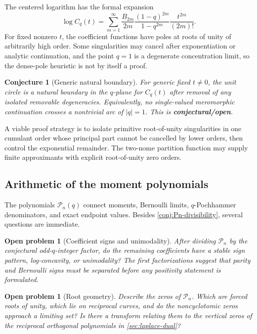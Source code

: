 \documentclass[11pt,oneside]{article}
\numberwithin{equation}{section}
\newtheorem{conjecture}[theorem]{Conjecture}
\newtheorem{problem}[theorem]{Open problem}
\theoremstyle{definition}
\theoremstyle{remark}
\newcommand{\openstatus}{\textcolor{deepred}{\textbf{conjectural/open}}}
\begin{document}
The centered logarithm has the formal expansion
\begin{equation}
 \log C_q(t)=
 \sum_{m=1}^{\infty}
 \frac{B_{2m}}{2m}
 \frac{(1-q)^{2m}}{1-q^{2m}}
 \frac{t^{2m}}{(2m)!}.
 \label{eq:logC-q}
\end{equation}
For fixed nonzero $t$, the coefficient functions have poles at roots of unity
of arbitrarily high order.  Some singularities may cancel after exponentiation
or analytic continuation, and the point $q=1$ is a degenerate concentration
limit, so the dense-pole heuristic is not by itself a proof.

\begin{conjecture}[Generic natural boundary]
\label{conj:natural-boundary}
For generic fixed $t\ne0$, the unit circle is a natural boundary in the
$q$-plane for $C_q(t)$ after removal of any isolated removable degeneracies.
Equivalently, no single-valued meromorphic continuation crosses a nontrivial
arc of $|q|=1$.  This is \openstatus.
\end{conjecture}

A viable proof strategy is to isolate primitive root-of-unity singularities in
one cumulant order whose principal part cannot be cancelled by lower orders,
then control the exponential remainder.  The two-nome partition function may
supply finite approximants with explicit root-of-unity zero orders.

\subsection{Arithmetic of the moment polynomials}

The polynomials $\mathcal P_n(q)$ connect moments, Bernoulli limits,
$q$-Pochhammer denominators, and exact endpoint values.  Besides
\cref{conj:Pn-divisibility}, several questions are immediate.

\begin{problem}[Coefficient signs and unimodality]
After dividing $\mathcal P_n$ by the conjectural odd-$q$-integer factor, do the
remaining coefficients have a stable sign pattern, log-concavity, or
unimodality?  The first factorizations suggest that parity and Bernoulli signs
must be separated before any positivity statement is formulated.
\end{problem}

\begin{problem}[Root geometry]
Describe the zeros of $\mathcal P_n$.  Which are forced roots of unity, which
lie on reciprocal curves, and do the noncyclotomic zeros approach a limiting
set?  Is there a transform relating them to the vertical zeros of the
reciprocal orthogonal polynomials in \cref{sec:laplace-dual}?
\end{problem}
\end{document}
